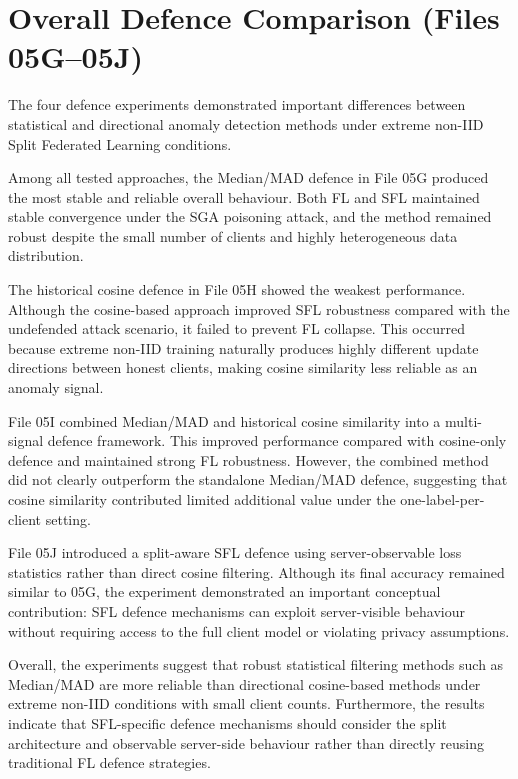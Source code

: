 \section*{Overall Defence Comparison (Files 05G--05J)}

The four defence experiments demonstrated important differences between statistical and directional anomaly detection methods under extreme non-IID Split Federated Learning conditions.

Among all tested approaches, the Median/MAD defence in File 05G produced the most stable and reliable overall behaviour. Both FL and SFL maintained stable convergence under the SGA poisoning attack, and the method remained robust despite the small number of clients and highly heterogeneous data distribution.

The historical cosine defence in File 05H showed the weakest performance. Although the cosine-based approach improved SFL robustness compared with the undefended attack scenario, it failed to prevent FL collapse. This occurred because extreme non-IID training naturally produces highly different update directions between honest clients, making cosine similarity less reliable as an anomaly signal.

File 05I combined Median/MAD and historical cosine similarity into a multi-signal defence framework. This improved performance compared with cosine-only defence and maintained strong FL robustness. However, the combined method did not clearly outperform the standalone Median/MAD defence, suggesting that cosine similarity contributed limited additional value under the one-label-per-client setting.

File 05J introduced a split-aware SFL defence using server-observable loss statistics rather than direct cosine filtering. Although its final accuracy remained similar to 05G, the experiment demonstrated an important conceptual contribution: SFL defence mechanisms can exploit server-visible behaviour without requiring access to the full client model or violating privacy assumptions.

Overall, the experiments suggest that robust statistical filtering methods such as Median/MAD are more reliable than directional cosine-based methods under extreme non-IID conditions with small client counts. Furthermore, the results indicate that SFL-specific defence mechanisms should consider the split architecture and observable server-side behaviour rather than directly reusing traditional FL defence strategies.